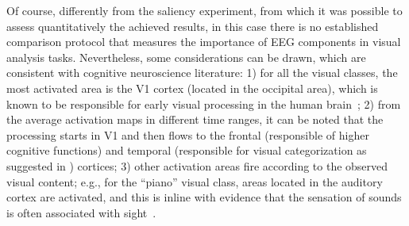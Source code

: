 \documentclass[10pt,journal,compsoc,twocolumn]{IEEEtran}
\begin{document}
Of course, differently from the saliency experiment, from which it was possible to assess quantitatively the achieved results, in this case there is no established comparison protocol that measures the importance of EEG components in visual analysis tasks. Nevertheless, some considerations can be drawn, which are consistent with cognitive neuroscience literature: 1) for all the visual classes, the most activated area is the V1 cortex (located in the occipital area), which is known to be responsible for early visual processing in the human brain~\cite{pmid29176609}; 2) from the average activation maps in different time ranges, it can be noted that the processing starts in V1 and then flows to the frontal (responsible of higher cognitive functions) and temporal (responsible for visual categorization  as suggested in \cite{pmid22325196}) cortices; 3) other activation areas fire according to the observed visual content; e.g., for the ``piano'' visual class, areas located in the auditory cortex are activated, and this is inline with evidence that the sensation of sounds is often associated with sight~\cite{pmid22355573}.      
\end{document}

